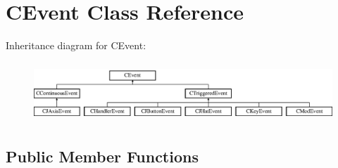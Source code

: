 \hypertarget{classCEvent}{\section{C\-Event Class Reference}
\label{classCEvent}
}
Inheritance diagram for C\-Event\-:\begin{figure}[H]
\begin{center}
\leavevmode
\includegraphics[height=2.258065cm]{classCEvent}
\end{center}
\end{figure}
\subsection*{Public Member Functions}
